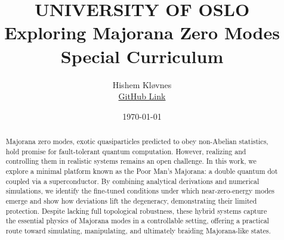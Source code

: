 \documentclass[11pt, letterpaper, titlepage]{article}
\title{
 \textbf{\LARGE UNIVERSITY OF OSLO} \\
\vspace{37mm}
\textbf{\Large Exploring Majorana Zero Modes}\\
\vspace{7mm}
\Large Special Curriculum \\
\vspace{25mm}
}
\author{\Large Hishem Kløvnes \\ \textcolor{blue}{\href{https://github.com/hishemok/Special_curriculum}{GitHub Link} }}
\date{\Large \today} %
\begin{document}
\sloppy
\maketitle
\newpage

\begin{abstract}
  Majorana zero modes, exotic quasiparticles predicted to obey non-Abelian statistics, hold promise for fault-tolerant quantum computation. However, realizing and controlling them in realistic systems remains an open challenge. In this work, we explore a minimal platform known as the Poor Man’s Majorana: a double quantum dot coupled via a superconductor. By combining analytical derivations and numerical simulations, we identify the fine-tuned conditions under which near-zero-energy modes emerge and show how deviations lift the degeneracy, demonstrating their limited protection. Despite lacking full topological robustness, these hybrid systems capture the essential physics of Majorana modes in a controllable setting, offering a practical route toward simulating, manipulating, and ultimately braiding Majorana-like states.
\end{abstract}

\tableofcontents
\newpage
\end{document}
